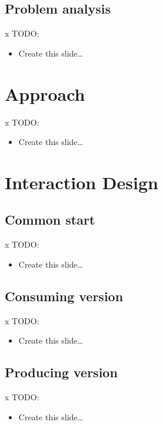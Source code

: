 \documentclass{beamer}
\begin{document}
\subsection{Problem analysis}
\begin{frame}{x}{}
TODO:
\begin{itemize}
\item Create this slide\ldots
\end{itemize}
\end{frame}



\section{Approach}
\begin{frame}{x}{}
TODO:
\begin{itemize}
\item Create this slide\ldots
\end{itemize}
\end{frame}



\section{Interaction Design}
\subsection{Common start}
\begin{frame}{x}{}
TODO:
\begin{itemize}
\item Create this slide\ldots
\end{itemize}
\end{frame}


\subsection{Consuming version}
\begin{frame}{x}{}
TODO:
\begin{itemize}
\item Create this slide\ldots
\end{itemize}
\end{frame}


\subsection{Producing version}
\begin{frame}{x}{}
TODO:
\begin{itemize}
\item Create this slide\ldots
\end{itemize}
\end{frame}
\end{document}
